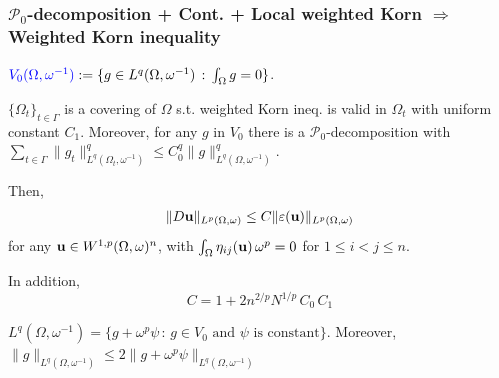 \documentclass[small,xcolor=svgnames]{beamer}
\def\o{\omega}
\def\O{\Omega}
\def\uu{{\bf u}}
\def\P{\mathcal{P}}
\def\c{\color{blue}}
\begin{document}
\begin{frame}\frametitle{$\P_0$-decomposition + Cont. + Local weighted Korn $\Rightarrow$ \\ Weighted Korn inequality}

${\c V_0(\O,\o^{-1})}:=\{g\in L^q(\O,\o^{-1})\,:\,\int_\O g=0\}$. 
\begin{theorem} $\{\O_t\}_{t\in\Gamma}$ is a covering of $\O$ s.t. weighted Korn ineq. is valid in $\O_t$ with uniform constant $C_1$. Moreover, for any $g$ in $V_0$ there is a $\P_0$-decomposition with $\sum_{t\in \Gamma} \|g_t\|^q_{L^q(\O_t,\o^{-1})}\leq C^q_0\|g\|^q_{L^q(\O,\o^{-1})}$.

Then, 
\begin{eqnarray*}
\|D\uu\|_{L^p(\O,\o)}\leq C \|\varepsilon(\uu)\|_{L^p(\O,\o)}
\end{eqnarray*}
for any $\uu\in W^{1,p}(\O,\o)^n$, with $\int_{\Omega}\eta_{ij}(\uu)\,\o^p=0$ for $1\leq i<j\leq n$. 

In addition, \[C=1+2n^{2/p}N^{1/p}\,C_0\,C_1\]
\end{theorem}

$L^q(\O,\o^{-1})=\{g+\o^p \psi\,:\,g\in V_0\text{ and }\psi\text{ is constant}\}$. Moreover, 
$\|g\|_{L^q(\O,\o^{-1})}\leq 2 \|g+\o^p\psi\|_{L^q(\O,\o^{-1})}$



\end{frame}





\end{document}
